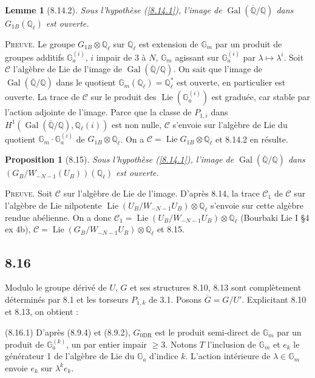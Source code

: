 \documentclass[12pt,a4paper]{article}
\theoremstyle{plain}
\newtheorem{lemma}[theorem]{Lemme}
\newtheorem{proposition}[theorem]{Proposition}
\theoremstyle{definition}
\theoremstyle{remark}
\DeclareMathOperator{\Lie}{Lie}
\DeclareMathOperator{\Gal}{Gal}
\newcommand{\Gm}{\mathbb{G}_m}
\newcommand{\Q}{\mathbb{Q}}
\newcommand{\DR}{\mathrm{DR}}
\begin{document}
\begin{lemma}[8.14.2]
Sous l'hypoth\`ese (\ref{8.14.1}), l'image de $\Gal(\overline{\Q}/\Q)$ dans $G_{1B}(\Q_\ell)$ est ouverte.
\end{lemma}

\textsc{Preuve.} Le groupe $G_{1B} \otimes \Q_\ell$ sur $\Q_\ell$ est extension de $\Gm$ par un produit de groupes additifs $\mathbb{G}_a^{(i)}$, $i$ impair de $3$ \`a $N$, $\Gm$ agissant sur $\mathbb{G}_a^{(i)}$ par $\lambda \mapsto \lambda^i$. Soit $\mathcal{C}$ l'alg\`ebre de Lie de l'image de $\Gal(\overline{\Q}/\Q)$. On sait que l'image de $\Gal(\overline{\Q}/\Q)$ dans le quotient $\Gm(\Q_\ell) = \Q_\ell^*$ est ouverte, en particulier est ouverte. La trace de $\mathcal{C}$ sur le produit des $\Lie(\mathbb{G}_a^{(i)})$ est gradu\'ee, car stable par l'action adjointe de l'image. Parce que la classe de $P_{1,i}$ dans $H^1(\Gal(\overline{\Q}/\Q), \Q_\ell(i))$ est non nulle, $\mathcal{C}$ s'envoie sur l'alg\`ebre de Lie du quotient $\Gm \cdot \mathbb{G}_a^{(i)}$ de $G_{1B} \otimes \Q_\ell$. On a $\mathcal{C} = \Lie G_{1B} \otimes \Q_\ell$ et 8.14.2 en r\'esulte.

\begin{proposition}[8.15]
Sous l'hypoth\`ese (\ref{8.14.1}), l'image de $\Gal(\overline{\Q}/\Q)$ dans $(G_B/W_{-N-1}(U_B))(\Q_\ell)$ est ouverte.
\end{proposition}

\textsc{Preuve.} Soit $\mathcal{C}$ sur l'alg\`ebre de Lie de l'image. D'apr\`es 8.14, la trace $\mathcal{C}_1$ de $\mathcal{C}$ sur l'alg\`ebre de Lie nilpotente $\Lie(U_B/W_{-N-1}U_B) \otimes \Q_\ell$ s'envoie sur cette alg\`ebre rendue ab\'elienne. On a donc $\mathcal{C}_1 = \Lie(U_B/W_{-N-1}U_B) \otimes \Q_\ell$ (Bourbaki Lie I \S 4 ex 4b), $\mathcal{C} = \Lie(G_B/W_{-N-1}U_B) \otimes \Q_\ell$ et 8.15.

\subsection*{8.16}

Modulo le groupe d\'eriv\'e de $U$, $G$ et ses structures 8.10, 8.13 sont compl\`etement d\'etermin\'es par 8.1 et les torseurs $P_{1,k}$ de 3.1. Posons $\overline{G} = G/U'$. Explicitant 8.10 et 8.13, on obtient :

(8.16.1) D'apr\`es (8.9.4) et (8.9.2), $G_{0\DR}$ est le produit semi-direct de $\Gm$ par un produit de $\mathbb{G}_a^{(k)}$, un par entier impair $\geq 3$. Notons $T$ l'inclusion de $\Gm$ et $e_k$ le g\'en\'erateur 1 de l'alg\`ebre de Lie du $\mathbb{G}_a$ d'indice $k$. L'action int\'erieure de $\lambda \in \Gm$ envoie $e_k$ sur $\lambda^k e_k$.
\end{document}
